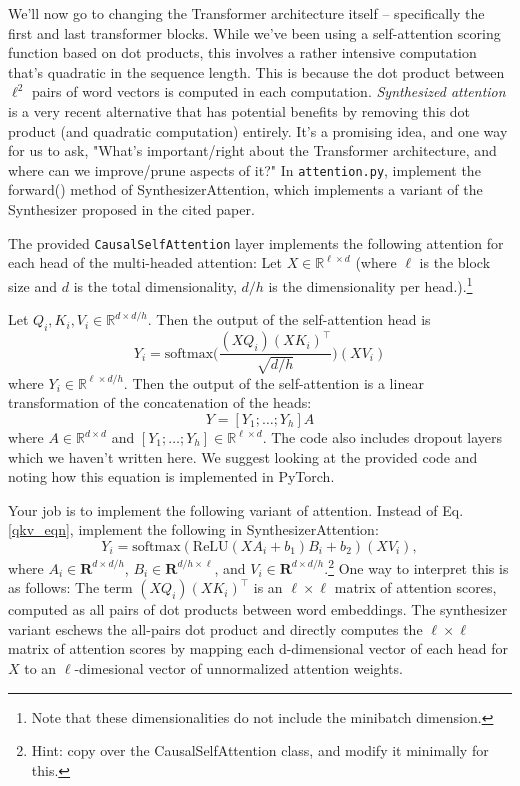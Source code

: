 \documentclass[letterpaper,12pt]{article}
\begin{document}
\begin{itemize}
		We'll now go to changing the Transformer architecture itself -- specifically the first and last transformer blocks.
		While we've been using a self-attention scoring function based on dot products, this involves a rather intensive computation that's quadratic in the sequence length. This is because the dot product between $\ell^2$ pairs of word vectors is computed in each computation. \textit{Synthesized attention} \cite{b3} is a very recent alternative that has potential benefits by removing this dot product (and quadratic computation) entirely. It's a promising idea, and one way for us to ask, "What's important/right about the Transformer architecture, and where can we improve/prune aspects of it?" In \texttt{attention.py}, implement the forward() method of SynthesizerAttention, which implements a variant of the Synthesizer proposed in the cited paper.
		
		The provided \texttt{CausalSelfAttention} layer implements the following attention for each head of the multi-headed attention: Let $X\in \mathbb{R}^{\ell \times d}$ (where $\ell$ is the block size and $d$ is the total dimensionality, $d/h$ is the dimensionality per head.).\footnote{Note that these dimensionalities do not include the minibatch dimension.}
		
		Let $Q_i,K_i,V_i \in \mathbb{R}^{d\times d/h}$.
		Then the output of the self-attention head is 
		\begin{equation} \label{qkv_eqn}
			Y_i = \text{softmax}\bigg(\frac{(XQ_i)(XK_i)^\top}{\sqrt{d/h}}\bigg)(XV_i)
		\end{equation}
		where $Y_i\in\mathbb{R}^{\ell \times d/h}$.
		Then the output of the self-attention is a linear transformation of the concatenation of the heads:
		\begin{equation}
			Y = [Y_1;\dots;Y_h]A
		\end{equation}
		where $A \in\mathbb{R}^{d\times d}$ and $[Y_1;\dots;Y_h]\in\mathbb{R}^{\ell \times d}$.
		The code also includes dropout layers which we haven't written here.
		We suggest looking at the provided code and noting how this equation is implemented in PyTorch.

		Your job is to implement the following variant of attention. Instead of Eq. \ref{qkv_eqn}, implement the
		following in SynthesizerAttention:
		\begin{equation}
			Y_i = \text{softmax}\left( \text{ReLU}(XA_i + b_1)B_i + b_2 \right)\left(XV_i\right),
		\end{equation}
		where $A_i \in \mathbf{R}^{d\times d/h}$, $B_i \in \mathbf{R}^{d/h \times \ell}$, and $V_i \in \mathbf{R}^{d \times d/h}$.\footnote{Hint: copy over the CausalSelfAttention class, and modify it minimally for this.} One way to interpret this is as follows: The term $(XQ_i)(XK_i)^\top$ is an $\ell \times \ell$ matrix of attention scores, computed as all pairs of dot products between word embeddings. The synthesizer variant eschews the all-pairs dot product and directly computes the $\ell \times \ell$ matrix of attention scores by mapping each d-dimensional vector of each head for $X$ to an $\ell$-dimesional vector of unnormalized attention weights.
		

\end{itemize}
\end{document}
